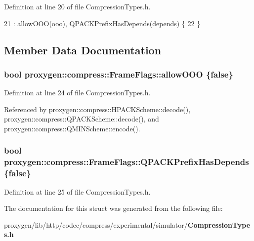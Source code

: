 Definition at line 20 of file Compression\+Types.\+h.


\begin{DoxyCode}
21       : allowOOO(ooo), QPACKPrefixHasDepends(depends) \{
22   \}
\end{DoxyCode}


\subsection{Member Data Documentation}
\subsubsection[{allow\+O\+OO}]{\setlength{\rightskip}{0pt plus 5cm}bool proxygen\+::compress\+::\+Frame\+Flags\+::allow\+O\+OO \{false\}}\label{structproxygen_1_1compress_1_1FrameFlags_a986bad1c0b19e9582264b7c346853d48}


Definition at line 24 of file Compression\+Types.\+h.



Referenced by proxygen\+::compress\+::\+H\+P\+A\+C\+K\+Scheme\+::decode(), proxygen\+::compress\+::\+Q\+P\+A\+C\+K\+Scheme\+::decode(), and proxygen\+::compress\+::\+Q\+M\+I\+N\+Scheme\+::encode().

\subsubsection[{Q\+P\+A\+C\+K\+Prefix\+Has\+Depends}]{\setlength{\rightskip}{0pt plus 5cm}bool proxygen\+::compress\+::\+Frame\+Flags\+::\+Q\+P\+A\+C\+K\+Prefix\+Has\+Depends \{false\}}\label{structproxygen_1_1compress_1_1FrameFlags_a183fa9479b62646a7ccdbd1da64f3743}


Definition at line 25 of file Compression\+Types.\+h.



The documentation for this struct was generated from the following file\+:\begin{DoxyCompactItemize}
\item 
proxygen/lib/http/codec/compress/experimental/simulator/{\bf Compression\+Types.\+h}\end{DoxyCompactItemize}
